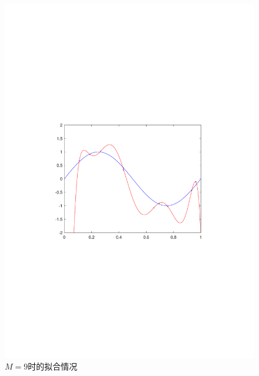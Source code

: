 \documentclass{article}
\begin{document}
\begin{homeworkProblem}
\begin{figure}[htbp]
\begin{minipage}{0.49\linewidth}
			\includegraphics[width=0.9\linewidth]{images/title/M=9.pdf}
			\caption{$M=9$时的拟合情况}
			\label{M=9}%
		\end{minipage}
	\end{figure}	
\end{homeworkProblem}


%
\end{document}
